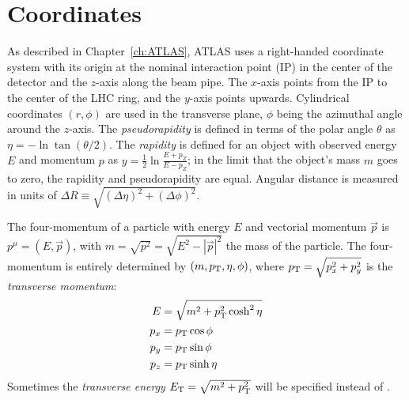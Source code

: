 \section{Coordinates}
As described in Chapter~\ref{ch:ATLAS}, ATLAS uses a right-handed coordinate system with its origin at the nominal interaction point (IP)
in the center of the detector and the \(z\)-axis along the beam pipe.
The \(x\)-axis points from the IP to the center of the LHC ring,
and the \(y\)-axis points upwards.
Cylindrical coordinates \((r,\phi)\) are used in the transverse plane,
\(\phi\) being the azimuthal angle around the \(z\)-axis.
The \textit{pseudorapidity} is defined in terms of the polar angle \(\theta\) as \(\eta = -\ln \tan(\theta/2)\).
The \textit{rapidity} is defined for an object with observed energy $E$ and momentum $p$ as \(y = \frac{1}{2}\ln\frac{E+p_Z}{E-p_Z}\); in the limit that the object's mass $m$ goes to zero, the rapidity and pseudorapidity are equal.
Angular distance is measured in units of \(\Delta R \equiv \sqrt{(\Delta\eta)^{2} + (\Delta\phi)^{2}}\).

The four-momentum of a particle with energy $E$ and vectorial momentum $\vec{p}$ is $p^\mu=(E,\vec{p})$, with $m=\sqrt{p^2}=\sqrt{E^2-|\vec{p}|^2}$ the mass of the particle.
The four-momentum is entirely determined by $(m,p_{\text{T}},\eta,\phi)$, where $p_{\text{T}}=\sqrt{p_x^2+p_y^2}$ is the \textit{transverse momentum}:
\begin{align}
E &= \sqrt{m^2+p_{\text{T}}^2 \cosh^2\eta}\\
p_x &= p_{\text{T}} \cos \phi\\
p_y &= p_{\text{T}} \sin \phi\\
p_z &= p_{\text{T}} \sinh \eta
\end{align}
Sometimes the \textit{transverse energy} $E_{\text{T}} = \sqrt{m^2+p_{\text{T}}^2}$ will be specified instead of \pT.


